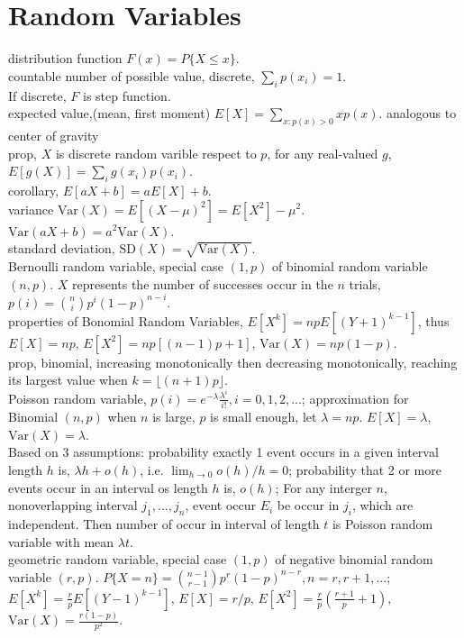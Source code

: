 \documentclass[paper=a4, fontsize=11pt]{scrartcl} %
\numberwithin{equation}{section} %
\numberwithin{figure}{section} %
\numberwithin{table}{section} %
\begin{document}
\section{Random Variables}
distribution function $F(x) = P\{X\leq x\}$.\\
countable number of possible value, discrete, $\sum_i p(x_i) = 1$.\\
If discrete, $F$ is step function.\\
expected value,(mean, first moment) $E[X] = \sum_{x:p(x)>0} xp(x)$. analogous to center of gravity\\
prop, $X$ is discrete random varible respect to $p$, for any real-valued $g$, $E[g(X)]= \sum_i g(x_i)p(x_i)$.\\
corollary, $E[aX+b] =aE[X]+b$.\\
variance $\text{Var}(X)=E[(X-\mu)^2] = E[X^2] - \mu^2$.\\
$\text{Var}(aX+b) = a^2 \text{Var}(X)$.\\
standard deviation, $\text{SD}(X) = \sqrt{\text{Var}(X)}$.\\
Bernoulli random variable, special case $(1,p)$ of binomial random variable $(n,p)$. $X$ represents the number of successes occur in the $n$ trials, $p(i)={n\choose i} p^i (1-p)^{n-i}$.\\
properties of Bonomial Random Variables, $E[X^k] = np E[(Y+1)^{k-1}]$, thus $E[X]=np$, $E[X^2] = np[(n-1)p+1]$, $\text{Var}(X) = np(1-p)$.\\
prop, binomial, increasing monotonically then decreasing monotonically, reaching its largest value when $k=\lfloor (n+1)p \rfloor$.\\
Poisson random variable, $p(i) = e^{-\lambda} \frac{\lambda^i}{i!}, i=0,1,2,...$; approximation for Binomial $(n,p)$ when $n$ is large, $p$ is small enough, let $\lambda=np$. $E[X]=\lambda$, $\text{Var}(X)=\lambda$.\\
Based on 3 assumptions: probability exactly 1 event occurs in a given interval length $h$ is, $\lambda h+o(h)$, i.e. $\lim_{h\rightarrow 0}o(h)/h = 0$; probability that 2 or more events occur in an interval os length $h$ is, $o(h)$; For any interger $n$, nonoverlapping interval $j_1,...,j_n$, event occur $E_i$ be occur in $j_i$, which are independent. Then number of occur in interval of length $t$ is Poisson random variable with mean $\lambda t$.\\
geometric random variable, special case $(1,p)$ of negative binomial random variable $(r,p)$. $P\{X=n\} = {n-1\choose r-1} p^r(1-p)^{n-r}, n=r,r+1,...$; $E[X^k] = \frac{r}{p}E[(Y-1)^{k-1}]$, $E[X]=r/p$, $E[X^2]=\frac{r}{p}(\frac{r+1}{p}+1)$, $\text{Var}(X)=\frac{r(1-p)}{p^2}$.\\
\end{document}

